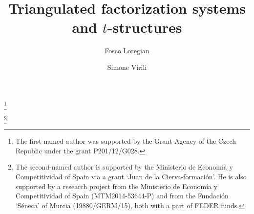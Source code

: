 \title{Triangulated factorization systems and $t$-structures}
\author{Fosco Loregian}
\address{%
\textsf{Fosco Loregian}: \newline
Centro de Matemática da Universidade de Coimbra \newline
Apartado 3008, EC Santa Cruz  - 501 Coimbra, Portugal \newline
\href{mailto:fosco.loregian@mat.uc.pt}
     {\sf fosco.loregian@mat.uc.pt}}
\thanks{ The first-named author was supported by the Grant Agency of the
         Czech Republic under the grant \textsc{P}201/12/\textsc{G}028.  }

\author[Simone Virili]{Simone Virili}
\address{
\textsf{Simone Virili}: \newline
Facultad de Matem\'aticas, Universidad de Murcia \newline
Campus Espinardo, , Murcia.  \newline
\href{mailto:virili.simone@gmail.com}
     {\sf virili.simone@gmail.com}}
\thanks{The second-named author is supported by the Ministerio de Econom\'ia y
Competitividad of Spain via a grant `Juan de la Cierva-formaci\'on'. He is also
supported by a research project from the Ministerio de Econom\'ia y
Competitividad of Spain (MTM2014-53644-P) and from the Fundaci\'on `S\'eneca'
of Murcia (19880/GERM/15), both with a part of FEDER funds.}

